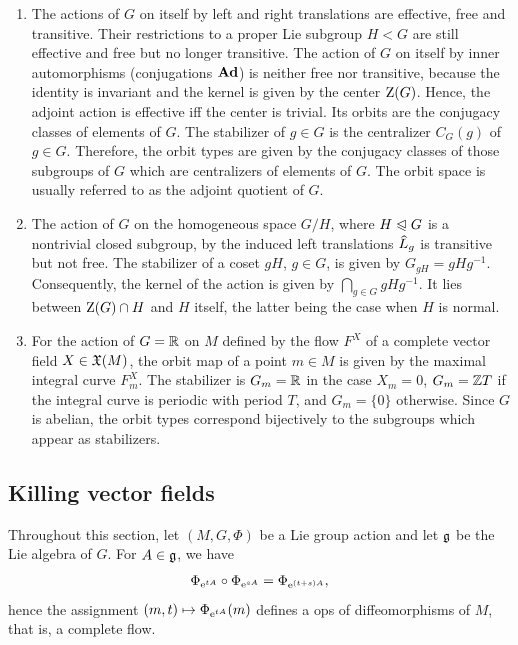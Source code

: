 \begin{example}
\begin{enumerate}
    \item  The actions of $G$ on itself by left and right translations are effective, free and transitive. Their restrictions to a proper Lie subgroup $H< G$ are still effective and free but no longer transitive. The action of $G$ on itself by inner automorphisms (conjugations $\mathrm{\mathbf{Ad}}$) is neither free nor transitive, because the identity is invariant and the kernel is given by the center $\mathrm{Z}(G)$. Hence, the adjoint action is effective iff the center is trivial. Its orbits are the conjugacy classes of elements of $G$. The stabilizer of $g\in G$ is the centralizer  $C_G(g)$ of $g\in G$. Therefore, the orbit types are given by the conjugacy classes of those subgroups of $G$ which are centralizers of elements of $G$. The orbit space is usually referred to as the adjoint quotient of $G$.
    \item The action of $G$ on the homogeneous space $G\slash H$, where $H\trianglelefteqslant G$ is a nontrivial closed subgroup, by the induced left translations $\wh{L}_g$ is transitive but not free. The stabilizer of a coset $gH$, $g\in G$, is given by $G_{gH}=gHg^{-1}$. Consequently, the kernel of the action is given by $\bigcap_{g\in G}gHg^{-1}$. It lies between $\mathrm{Z}(G)\cap H$ and $H$ itself, the latter being the case when $H$ is normal.
    \item For the action of $G=\mathbb{R}$ on $M$ defined by the flow $F^X$ of a complete vector field $X\in\mathfrak{X}(M)$, the orbit map of a point $m\in M$ is given by the maximal integral curve $F^X_m$. The stabilizer is $G_m=\mathbb{R}$ in the case $X_m=0$, $G_m=\mathbb{Z} T$ if the integral curve is periodic with period $T$, and $G_m=\{0\}$ otherwise. Since $G$ is abelian, the orbit types correspond bijectively to the subgroups which appear as stabilizers.
\end{enumerate}
\end{example}





\subsection{Killing vector fields}\label{sec Killing vectors}

Throughout this section, let $(M,G,\Phi)$ be a Lie group action and let $\mathfrak{g}$ be the Lie algebra of $G$. For $A\in \mathfrak{g}$, we have
\[\Phi_{\mathrm{e}^{tA}}\circ\Phi_{\mathrm{e}^{sA}}=\Phi_{\mathrm{e}^{(t+s)A}},\]
hence the assignment $(m,t)\mapsto \Phi_{\mathrm{e}^{tA}}(m)$ defines a \gls{ops} of diffeomorphisms of $M$, that is, a complete flow.

